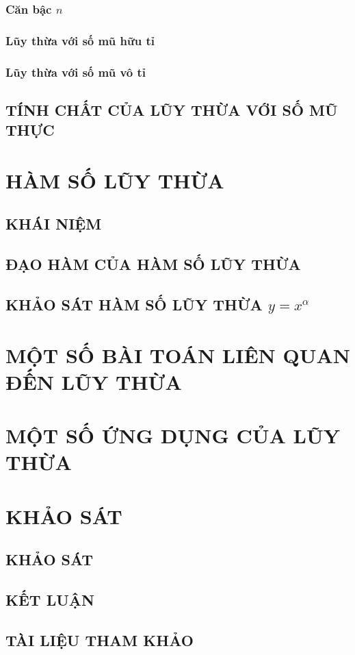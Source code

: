 \documentclass{article}
\begin{document}
\subsubsection{Căn bậc $n$}
\subsubsection{Lũy thừa với số mũ hữu tỉ}
\subsubsection{Lũy thừa với số mũ vô tỉ}

\subsection{TÍNH CHẤT CỦA LŨY THỪA VỚI SỐ MŨ THỰC}

\section{HÀM SỐ LŨY THỪA}

\subsection{KHÁI NIỆM}
\subsection{ĐẠO HÀM CỦA HÀM SỐ LŨY THỪA}
\subsection{KHẢO SÁT HÀM SỐ LŨY THỪA $y=x^{\alpha}$}

\section{MỘT SỐ BÀI TOÁN LIÊN QUAN ĐẾN LŨY THỪA}

\section{MỘT SỐ ỨNG DỤNG CỦA LŨY THỪA}

\section{KHẢO SÁT}
\subsection{KHẢO SÁT}
\subsection{KẾT LUẬN}
\subsection{TÀI LIỆU THAM KHẢO}
\end{document}

